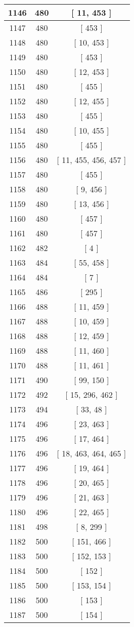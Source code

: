 \begin{center}
\begin{longtable}[H]{|| c c c ||}
\hline
1146 & 480 & [ 11, 453 ] \\ 
\hline
1147 & 480 & [ 453 ] \\ 
\hline
1148 & 480 & [ 10, 453 ] \\ 
\hline
1149 & 480 & [ 453 ] \\ 
\hline
1150 & 480 & [ 12, 453 ] \\ 
\hline
1151 & 480 & [ 455 ] \\ 
\hline
1152 & 480 & [ 12, 455 ] \\ 
\hline
1153 & 480 & [ 455 ] \\ 
\hline
1154 & 480 & [ 10, 455 ] \\ 
\hline
1155 & 480 & [ 455 ] \\ 
\hline
1156 & 480 & [ 11, 455, 456, 457 ] \\ 
\hline
1157 & 480 & [ 455 ] \\ 
\hline
1158 & 480 & [ 9, 456 ] \\ 
\hline
1159 & 480 & [ 13, 456 ] \\ 
\hline
1160 & 480 & [ 457 ] \\ 
\hline
1161 & 480 & [ 457 ] \\ 
\hline
1162 & 482 & [ 4 ] \\ 
\hline
1163 & 484 & [ 55, 458 ] \\ 
\hline
1164 & 484 & [ 7 ] \\ 
\hline
1165 & 486 & [ 295 ] \\ 
\hline
1166 & 488 & [ 11, 459 ] \\ 
\hline
1167 & 488 & [ 10, 459 ] \\ 
\hline
1168 & 488 & [ 12, 459 ] \\ 
\hline
1169 & 488 & [ 11, 460 ] \\ 
\hline
1170 & 488 & [ 11, 461 ] \\ 
\hline
1171 & 490 & [ 99, 150 ] \\ 
\hline
1172 & 492 & [ 15, 296, 462 ] \\ 
\hline
1173 & 494 & [ 33, 48 ] \\ 
\hline
1174 & 496 & [ 23, 463 ] \\ 
\hline
1175 & 496 & [ 17, 464 ] \\ 
\hline
1176 & 496 & [ 18, 463, 464, 465 ] \\ 
\hline
1177 & 496 & [ 19, 464 ] \\ 
\hline
1178 & 496 & [ 20, 465 ] \\ 
\hline
1179 & 496 & [ 21, 463 ] \\ 
\hline
1180 & 496 & [ 22, 465 ] \\ 
\hline
1181 & 498 & [ 8, 299 ] \\ 
\hline
1182 & 500 & [ 151, 466 ] \\ 
\hline
1183 & 500 & [ 152, 153 ] \\ 
\hline
1184 & 500 & [ 152 ] \\ 
\hline
1185 & 500 & [ 153, 154 ] \\ 
\hline
1186 & 500 & [ 153 ] \\ 
\hline
1187 & 500 & [ 154 ] \\ 
\hline
\end{longtable}
\end{center}
